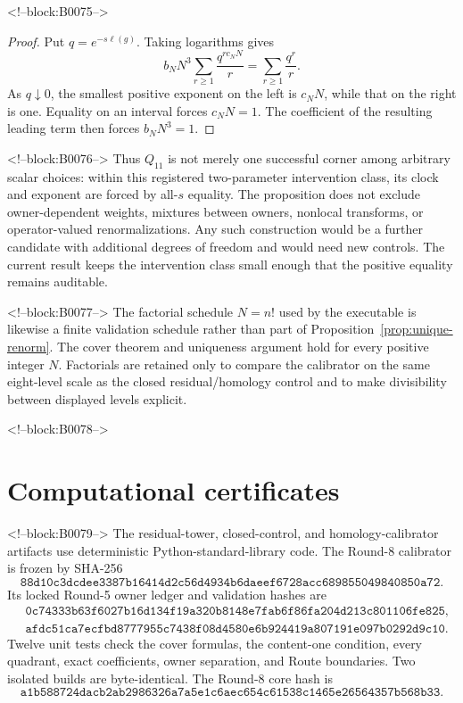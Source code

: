 \documentclass[11pt]{article}
\theoremstyle{definition}
\theoremstyle{remark}
\begin{document}
<!--block:B0075-->
\begin{proof}
Put $q=e^{-s\ell(g)}$. Taking logarithms gives
\[
b_NN^3\sum_{r\geq1}\frac{q^{r c_NN}}r
=\sum_{r\geq1}\frac{q^r}r.
\]
As $q\downarrow0$, the smallest positive exponent on the left is $c_NN$, while that on the right is one. Equality on an interval forces $c_NN=1$. The coefficient of the resulting leading term then forces $b_NN^3=1$.
\end{proof}

<!--block:B0076-->
Thus $Q_{11}$ is not merely one successful corner among arbitrary scalar choices: within this registered two-parameter intervention class, its clock and exponent are forced by all-$s$ equality. The proposition does not exclude owner-dependent weights, mixtures between owners, nonlocal transforms, or operator-valued renormalizations. Any such construction would be a further candidate with additional degrees of freedom and would need new controls. The current result keeps the intervention class small enough that the positive equality remains auditable.

<!--block:B0077-->
The factorial schedule $N=n!$ used by the executable is likewise a finite validation schedule rather than part of Proposition~\ref{prop:unique-renorm}. The cover theorem and uniqueness argument hold for every positive integer $N$. Factorials are retained only to compare the calibrator on the same eight-level scale as the closed residual/homology control and to make divisibility between displayed levels explicit.

<!--block:B0078-->
\section{Computational certificates}

<!--block:B0079-->
The residual-tower, closed-control, and homology-calibrator artifacts use deterministic Python-standard-library code. The Round-8 calibrator is frozen by SHA-256
\[
\texttt{88d10c3dcdee3387b16414d2c56d4934b6daeef6728acc689855049840850a72}.
\]
Its locked Round-5 owner ledger and validation hashes are
\begin{align*}
&\texttt{0c74333b63f6027b16d134f19a320b8148e7fab6f86fa204d213c801106fe825},\\
&\texttt{afdc51ca7ecfbd8777955c7438f08d4580e6b924419a807191e097b0292d9c10}.
\end{align*}
Twelve unit tests check the cover formulas, the content-one condition, every quadrant, exact coefficients, owner separation, and Route boundaries. Two isolated builds are byte-identical. The Round-8 core hash is
\[
\texttt{a1b588724dacb2ab2986326a7a5e1c6aec654c61538c1465e26564357b568b33}.
\]
\end{document}
